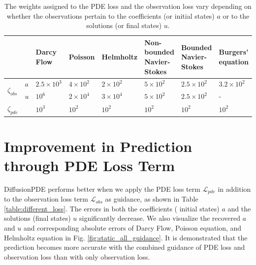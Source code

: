 \begin{table}[H]
    \caption{The weights assigned to the PDE loss and the observation loss vary depending on whether the observations pertain to the coefficients (or initial states) $a$ or to the solutions (or final states) $u$.}
  \label{table:weights}
  \centering
  \begin{tabular}{lllllp{2cm}p{2cm}p{1.5cm}}
    \toprule
     & & Darcy Flow   & Poisson & Helmholtz & Non-bounded Navier-Stokes & Bounded Navier-Stokes & Burgers' equation \\
    \midrule
    \multirow{2}{*}{$\zeta_{obs}$} & $a$ & $2.5\times 10^3$ & $4\times 10^2$ & $2\times 10^2$ & $5\times 10^2$ & $2.5\times 10^2$ & $3.2\times 10^2$ \\
    & $u$ & $10^6$ & $2\times 10^4$ & $3\times 10^4$ & $5\times 10^2$ & $2.5\times 10^2$ & -\\
    \midrule
    $\zeta_{pde}$ & & $10^3$ & $10^2$ & $10^2$ & $10^2$ & $10^2$ & $10^2$\\
    \bottomrule
  \end{tabular}
\end{table}

\vspace{-0.4em}
\section{Improvement in Prediction through PDE Loss Term}\label{sec:prediction}
\vspace{-0.3em}

DiffusionPDE performs better when we apply the PDE loss term $\mathcal{L}_{pde}$ in addition to the observation loss term $\mathcal{L}_{obs}$ as guidance, as shown in Table \ref{table:different_loss}. The errors in both the coefficients ( initial states) $a$ and the solutions (final states) $u$ significantly decrease. We also visualize the recovered $a$ and $u$ and corresponding absolute errors of Darcy Flow, Poisson equation, and Helmholtz equation in Fig. \ref{fig:static_all_guidance}. It is demonstrated that the prediction becomes more accurate with the combined guidance of PDE loss and observation loss than with only observation loss.


